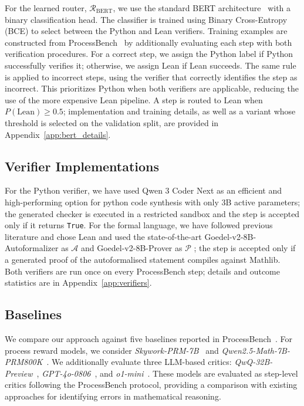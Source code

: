 For the learned router, $\mathcal{R}_{\mathrm{BERT}}$, we use the standard BERT architecture~\cite{devlin-etal-2019-bert} with a binary classification head. The classifier is trained using Binary Cross-Entropy (BCE) to select between the Python and Lean verifiers. Training examples are constructed from ProcessBench~\cite{processbench} by additionally evaluating each step with both verification procedures. For a correct step, we assign the Python label if Python successfully verifies it; otherwise, we assign Lean if Lean succeeds. The same rule is applied to incorrect steps, using the verifier that correctly identifies the step as incorrect. This prioritizes Python when both verifiers are applicable, reducing the use of the more expensive Lean pipeline. A step is routed to Lean when $P(\mathrm{Lean}) \geq 0.5$; implementation and training details, as well as a variant whose threshold is selected on the validation split, are provided in Appendix~\ref{app:bert_details}.

\subsection{Verifier Implementations}
For the Python verifier, we have used Qwen 3 Coder Next \cite{qwen_qwen3_coder_next_tech_report} as an efficient and high-performing option for python code synthesis with only 3B active parameters; the generated checker is executed in a restricted sandbox and the step is accepted only if it returns \texttt{True}.
For the formal language, we have followed previous literature and chose Lean and used the state-of-the-art Goedel-v2-8B-Autoformalizer as $\mathcal{A}$ and Goedel-v2-8B-Prover as $\mathcal{P}$ \cite{goedel2025}; the step is accepted only if a generated proof of the autoformalised statement compiles against Mathlib. Both verifiers are run once on every ProcessBench step; details and outcome statistics are in Appendix~\ref{app:verifiers}.

\subsection{Baselines}

We compare our approach against five baselines reported in ProcessBench~\cite{processbench}. For process reward models, we consider \textit{Skywork-PRM-7B}~\cite{skywork2024} and \textit{Qwen2.5-Math-7B-PRM800K}~\cite{processbench}. We additionally evaluate three LLM-based critics: \textit{QwQ-32B-Preview}~\cite{qwq2024}, \textit{GPT-4o-0806}~\cite{openai2024gpt4o}, and \textit{o1-mini}~\cite{openai2024o1mini}. These models are evaluated as step-level critics following the ProcessBench protocol, providing a comparison with existing approaches for identifying errors in mathematical reasoning.

